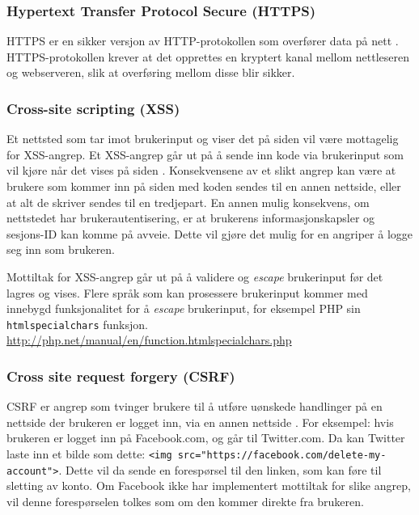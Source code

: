 \subsubsection{Hypertext Transfer Protocol Secure (HTTPS)}
\label{sec:analysis-security-https}
HTTPS er en sikker versjon av HTTP-protokollen som overfører data på nett \cite{rfc26161999hypertext}. HTTPS-protokollen krever at det opprettes en kryptert kanal mellom nettleseren og webserveren, slik at overføring mellom disse blir sikker.

\subsubsection{Cross-site scripting (XSS)}
\label{sec:analysis-security-xss}
Et nettsted som tar imot brukerinput og viser det på siden vil være mottagelig for XSS-angrep.
Et XSS-angrep går ut på å sende inn kode via brukerinput som vil kjøre når det vises på siden \cite[s.~179-183]{NattTomHeine2015Datasikkerhet}. Konsekvensene av et slikt angrep kan være at brukere som kommer inn på siden med koden sendes til en annen nettside, eller at alt de skriver sendes til en tredjepart. En annen mulig konsekvens, om nettstedet har brukerautentisering, er at brukerens informasjonskapsler og sesjons-ID kan komme på avveie. Dette vil gjøre det mulig for en angriper å logge seg inn som brukeren.

Mottiltak for XSS-angrep går ut på å validere og \textit{escape} brukerinput før det lagres og vises.
Flere språk som kan prosessere brukerinput kommer med innebygd funksjonalitet for å \textit{escape} brukerinput, for eksempel PHP sin \lstinline{htmlspecialchars} funksjon. \url{http://php.net/manual/en/function.htmlspecialchars.php}

\subsubsection{Cross site request forgery (CSRF)}
\label{sec:analysis-security-csrf}
CSRF er angrep som tvinger brukere til å utføre uønskede handlinger på en nettside der brukeren er logget inn, via en annen nettside \cite[s.~183-186]{NattTomHeine2015Datasikkerhet}. For eksempel: hvis brukeren er logget inn på Facebook.com, og går til Twitter.com. Da kan Twitter laste inn et bilde som dette: \lstinline{<img src="https://facebook.com/delete-my-account">}. Dette vil da sende en forespørsel til den linken, som kan føre til sletting av konto. Om Facebook ikke har implementert mottiltak for slike angrep, vil denne forespørselen tolkes som om den kommer direkte fra brukeren.

